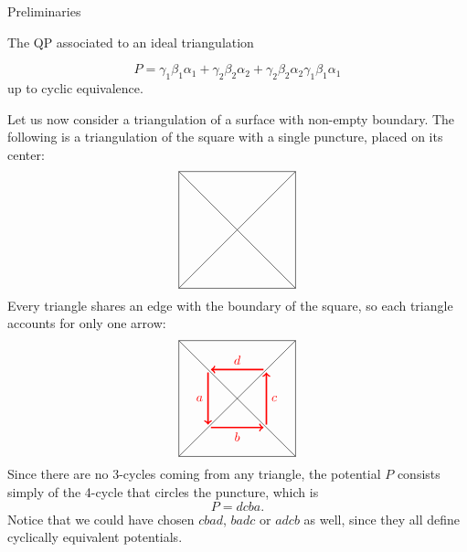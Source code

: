 \begin{chapter}{Preliminaries}
\begin{section}{The QP associated to an ideal triangulation}
\begin{exmp}
\[P = \gamma_1\beta_1\alpha_1+\gamma_2\beta_2\alpha_2+\gamma_2\beta_2\alpha_2\gamma_1\beta_1\alpha_1\]
up to cyclic equivalence.
\end{exmp}
\begin{exmp} Let us now consider a triangulation of a surface with non-empty boundary. The following is a triangulation of the square with a single puncture, placed on its center:
\[
\begin{tikzpicture}[scale=0.8]
\draw (-2,-2) to (-2,2);
\draw (-2,2) to (2,2);
\draw (2,2) to (2,-2);
\draw (2,-2) to (-2,-2);
\draw (-2,-2) to (2,2);
\draw (-2,2) to (2,-2);
\end{tikzpicture}
\]
Every triangle shares an edge with the boundary of the square, so each triangle accounts for only one arrow:
\[
\begin{tikzpicture}[scale=0.8]
\draw (-2,-2) to (-2,2);
\draw (-2,2) to (2,2);
\draw (2,2) to (2,-2);
\draw (2,-2) to (-2,-2);
\draw (-2,-2) to (2,2);
\draw (-2,2) to (2,-2);
\draw[->, red, very thick] (-1,0.9) to node[left] {$a$} (-1, -0.9);
\draw[->, red, very thick] (-0.9,-1) to node[below] {$b$} (0.9, -1);
\draw[->, red, very thick] (1,-0.9) to node[right] {$c$} (1, 0.9);
\draw[->, red, very thick] (0.9, 1) to node[above] {$d$} (-0.9, 1);
\end{tikzpicture}
\]
Since there are no 3-cycles coming from any triangle, the potential $P$ consists simply of the 4-cycle that circles the puncture, which is
\[P=dcba.\]
Notice that we could have chosen $cbad$, $badc$ or $adcb$ as well, since they all define cyclically equivalent potentials.
\end{exmp}
\end{section}
\end{chapter}